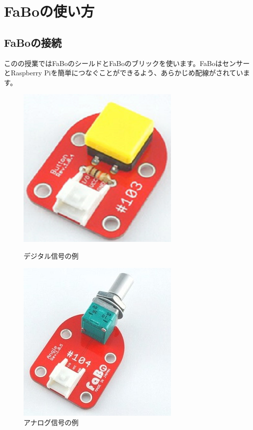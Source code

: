 \section{FaBoの使い方}
\subsection{FaBoの接続}
このの授業ではFaBoのシールドとFaBoのブリックを使います。FaBoはセンサーとRaspberry Piを簡単につなぐことができるよう、あらかじめ配線がされています。

\begin{figure}[htbp]
  \begin{minipage}[b]{0.45\linewidth}
    \centering
    \includegraphics[keepaspectratio, scale=0.6]{images/chap05/text05-img028.png}
    \caption{デジタル信号の例}
    \label{fig4}
  \end{minipage}
  \begin{minipage}[b]{0.45\linewidth}
    \centering
    \includegraphics[keepaspectratio, scale=0.6]{images/chap05/text05-img022.jpg}
    \caption{アナログ信号の例}
    \label{fig5}
  \end{minipage}
\end{figure}


